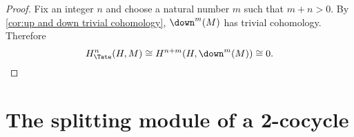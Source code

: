 \begin{proof}
	Fix an integer $n$ and choose a natural number $m$ such that $m + n > 0$.
	By \ref{cor:up and down trivial cohomology}, $\down^m(M)$ has trivial cohomology.
	Therefore
	\[
		H^n_{\Tate}(H,M) \cong H^{n+m}(H, \down^m(M)) \cong 0.
	\]
\end{proof}











\section{The splitting module of a 2-cocycle}

